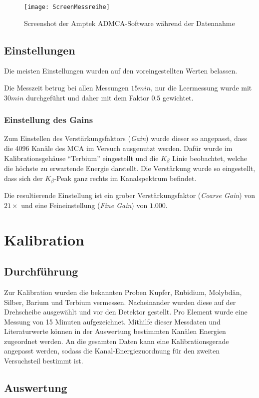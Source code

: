 \documentclass{../Misc/MontavonLaTeX/Montavon}
\newcommand{\fullwidth}{1.0\textwidth}
\begin{document}
\begin{figure}[htbp]
\centering
\texttt{[image: ScreenMessreihe]}
\caption{Screenshot der Amptek ADMCA-Software während der Datennahme}
\label{fig:ADMCA}
\end{figure}


\subsection{Einstellungen}
Die meisten Einstellungen wurden auf den voreingestellten Werten belassen.

Die Messzeit betrug bei allen Messungen $15 \unit{min}$, nur die Leermessung wurde mit $30 \unit{min}$ durchgeführt und daher mit dem Faktor $0.5$ gewichtet.

\subsubsection{Einstellung des Gains}
Zum Einstellen des Verstärkungsfaktors (\emph{Gain}) wurde dieser so angepasst, dass die 4096 Kanäle des MCA im Versuch ausgenutzt werden. Dafür wurde im Kalibrationsgehäuse \enquote{Terbium} eingestellt und die $K_\beta$ Linie beobachtet, welche die höchste zu erwartende Energie darstellt. Die Verstärkung wurde so eingestellt, dass sich der $K_\beta$-Peak ganz rechts im Kanalspektrum befindet.

Die resultierende Einstellung ist ein grober Verstärkungsfaktor (\emph{Coarse Gain}) von $21 \times$ und eine Feineinstellung (\emph{Fine Gain}) von $1.000$. 

\section{Kalibration}
\subsection{Durchführung}
Zur Kalibration wurden die bekannten Proben Kupfer, Rubidium, Molybdän, Silber, Barium und Terbium vermessen. Nacheinander wurden diese auf der Drehscheibe ausgewählt und vor den Detektor gestellt. Pro Element wurde eine Messung von 15 Minuten aufgezeichnet. 
Mithilfe dieser Messdaten und Literaturwerte können in der Auswertung bestimmten Kanälen Energien zugeordnet werden. An die gesamten Daten kann eine Kalibrationsgerade angepasst werden, sodass die Kanal-Energiezuordnung für den zweiten Versuchsteil bestimmt ist.

\subsection{Auswertung}
\end{document}
